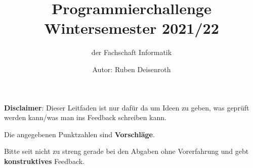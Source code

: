 \documentclass[ngerman,accentcolor=3c,colorbacktitle,12pt,T1,points=true, RGB]{tudaexercise}
\begin{document}
\title{Programmierchallenge Wintersemester 2021/22}
\subtitle{der Fachschaft Informatik}
\author{Autor: Ruben Deisenroth}
\maketitle
\begin{tcolorbox}[
		colback=\IfDarkModeTF{accentcolor!20!\thepagecolor}{accentcolor!10!\thepagecolor}, %
		coltext=.,
		colframe=gray, %
		frame hidden,
		title style=accentcolor,
		arc=3pt,
		boxrule=0pt,
		left=5pt, %
		enhanced, %
		fonttitle=\sffamily, %
		overlay={ %
				\begin{tcbclipinterior}%
					\fill[TUDa-3c] (frame.south west) rectangle ([xshift=4pt]frame.north west); %
				\end{tcbclipinterior}%
			}]
	\textbf{\textsf{Disclaimer}}: Dieser Leitfaden ist nur dafür da um Ideen zu geben, was geprüft werden kann/was man ins Feedback schreiben kann.

	Die angegebenen Punktzahlen sind \textbf{Vorschläge}.
\end{tcolorbox}
Bitte seit nicht zu streng gerade bei den Abgaben ohne Vorerfahrung und gebt \textbf{konstruktives} Feedback.
\end{document}
